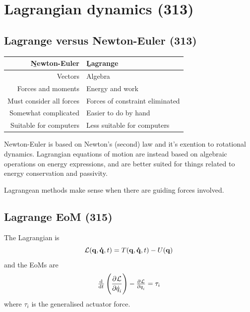 \documentclass[a4paper, 12pt]{article}
\begin{document}
\section{Lagrangian dynamics (313)}
\subsection{Lagrange versus Newton-Euler (313)}

\begin{center}
	\begin{tabular}{rl}
		\b{Newton-Euler} & \b{Lagrange} \\
		\hline
		Vectors & Algebra \\
		Forces and moments & Energy and work \\
		Must consider all forces & Forces of constraint eliminated \\
		Somewhat complicated & Easier to do by hand \\
		Suitable for computers & Less suitable for computers \\
	\end{tabular}
\end{center}

Newton-Euler is based on Newton's (second) law and it's exention to rotational dynamics. Lagrangian equations of motion are instead based on algebraic operations on energy expressions, and are better suited for things related to energy conservation and passivity.

Lagrangean methods make sense when there are guiding forces involved.

\subsection{Lagrange EoM (315)}
The Lagrangian is
\begin{equation}
	\mathcal{L}(\mathbf{q}, \mathbf{\dot{q}}, t) = T(\mathbf{q}, \mathbf{\dot{q}}, t) - U(\mathbf{q})
\end{equation}
and the EoMs are
\begin{equation}
	\od{}{t} \left( \dpd{\lagr}{\dot{q}_i} \right) - \pd{\lagr}{q_i} = \tau_i
\end{equation}
where \(\tau_i\) is the generalised actuator force.
\end{document}
